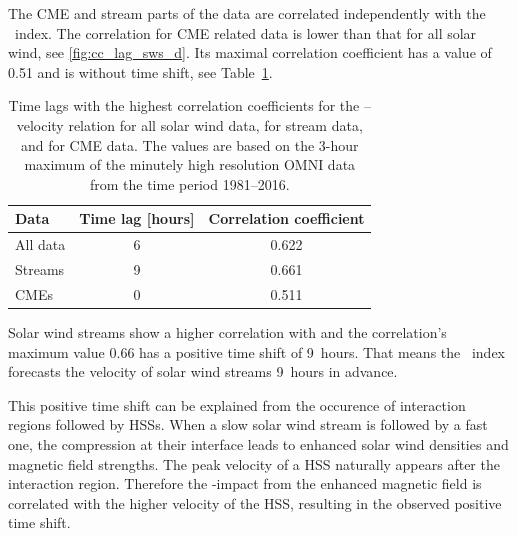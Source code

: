 The CME and stream parts of the data are correlated independently with the \Kp~index. The correlation for CME related data is lower than that for all solar wind, see \autoref{fig:cc_lag_sws_d}. Its maximal correlation coefficient has a value of 0.51 and is without time shift, see Table~\ref{tab:correlation_coefficients_kpvsv}.
\begin{table}
	\caption{Time lags with the highest correlation coefficients for the \Kp{}--velocity relation for all solar wind data, for stream data, and for CME data. The values are based on the 3-hour maximum of the minutely high resolution OMNI data from the time period 1981--2016.}
	\label{tab:correlation_coefficients_kpvsv}
	\centering
	\begin{tabular}{lcc}
		\hline\hline
		Data	&Time lag [hours]	&Correlation coefficient\\
		\hline
		All data	&6	&0.622\\
		Streams	&9	&0.661\\
		CMEs	&0	&0.511\\
		\hline
	\end{tabular}
\end{table}
% 
Solar wind streams show a higher correlation with \Kp{} and the correlation's maximum value 0.66 has a positive time shift of 9~hours. That means the \Kp~index forecasts the velocity of solar wind streams 9~hours in advance.

This positive time shift can be explained from the occurence of interaction regions followed by HSSs. When a slow solar wind stream is followed by a fast one, the compression at their interface leads to enhanced solar wind densities and magnetic field strengths. The peak velocity of a HSS naturally appears after the interaction region. Therefore the \Kp-impact from the enhanced magnetic field is correlated with the higher velocity of the HSS, resulting in the observed positive time shift.\\


